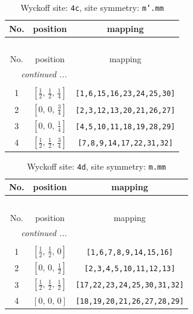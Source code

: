 \documentclass[fleqn,8pt]{jsarticle}
\begin{document}
\renewcommand{\arraystretch}{1.2}
\begin{longtable}{ccc}
\caption{Wyckoff site: {\tt 4c}, site symmetry: {\tt m'.mm}}
 \\
 \hline \hline
No. & position & mapping \\ \hline \endfirsthead

\multicolumn{2}{l}{\tablename\ \thetable{}} \\
 \hline \hline
No. & position & mapping \\ \hline \endhead

 \hline \hline
\multicolumn{2}{r}{\footnotesize\it continued ...} \\ \endfoot

 \hline \hline
\multicolumn{2}{r}{} \\ \endlastfoot

1 & $\left[ \frac{1}{2},\, \frac{1}{2},\, \frac{1}{4} \right]$ & {\tt [1,6,15,16,23,24,25,30]} \\ \hline
2 & $\left[ 0,\, 0,\, \frac{3}{4} \right]$ & {\tt [2,3,12,13,20,21,26,27]} \\ \hline
3 & $\left[ 0,\, 0,\, \frac{1}{4} \right]$ & {\tt [4,5,10,11,18,19,28,29]} \\ \hline
4 & $\left[ \frac{1}{2},\, \frac{1}{2},\, \frac{3}{4} \right]$ & {\tt [7,8,9,14,17,22,31,32]} \\
\end{longtable}
\renewcommand{\arraystretch}{1.2}
\begin{longtable}{ccc}
\caption{Wyckoff site: {\tt 4d}, site symmetry: {\tt m.mm}}
 \\
 \hline \hline
No. & position & mapping \\ \hline \endfirsthead

\multicolumn{2}{l}{\tablename\ \thetable{}} \\
 \hline \hline
No. & position & mapping \\ \hline \endhead

 \hline \hline
\multicolumn{2}{r}{\footnotesize\it continued ...} \\ \endfoot

 \hline \hline
\multicolumn{2}{r}{} \\ \endlastfoot

1 & $\left[ \frac{1}{2},\, \frac{1}{2},\, 0 \right]$ & {\tt [1,6,7,8,9,14,15,16]} \\ \hline
2 & $\left[ 0,\, 0,\, \frac{1}{2} \right]$ & {\tt [2,3,4,5,10,11,12,13]} \\ \hline
3 & $\left[ \frac{1}{2},\, \frac{1}{2},\, \frac{1}{2} \right]$ & {\tt [17,22,23,24,25,30,31,32]} \\ \hline
4 & $\left[ 0,\, 0,\, 0 \right]$ & {\tt [18,19,20,21,26,27,28,29]} \\
\end{longtable}
\end{document}
